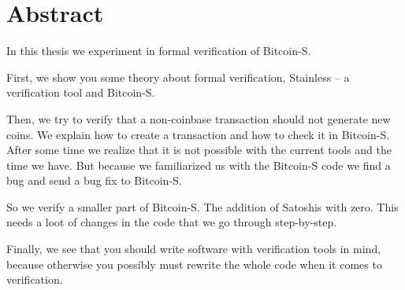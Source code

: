 \chapter*{Abstract}
\label{chap:abstract}

In this thesis we experiment in formal verification of Bitcoin-S.

First, we show you some theory about formal verification, Stainless -- a verification tool and Bitcoin-S.

Then, we try to verify that a non-coinbase transaction should not generate new coins.
We explain how to create a transaction and how to check it in Bitcoin-S.
After some time we realize that it is not possible with the current tools and the time we have.
But because we familiarized us with the Bitcoin-S code we find a bug and send a bug fix to Bitcoin-S.

So we verify a smaller part of Bitcoin-S.
The addition of Satoshis with zero.
This needs a loot of changes in the code that we go through step-by-step.

Finally, we see that you should write software with verification tools in mind, because otherwise you possibly must rewrite the whole code when it comes to verification.






